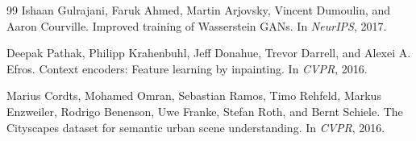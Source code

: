 \documentclass{article}
\begin{document}
\begin{thebibliography}{99}
Ishaan Gulrajani, Faruk Ahmed, Martin Arjovsky, Vincent Dumoulin, and
Aaron Courville.
\newblock Improved training of Wasserstein GANs.
\newblock In \emph{NeurIPS}, 2017.

Deepak Pathak, Philipp Krahenbuhl, Jeff Donahue, Trevor Darrell, and Alexei A.
Efros.
\newblock Context encoders: Feature learning by inpainting.
\newblock In \emph{CVPR}, 2016.

Marius Cordts, Mohamed Omran, Sebastian Ramos, Timo Rehfeld, Markus Enzweiler,
Rodrigo Benenson, Uwe Franke, Stefan Roth, and Bernt Schiele.
\newblock The Cityscapes dataset for semantic urban scene understanding.
\newblock In \emph{CVPR}, 2016.

\end{thebibliography}
\end{document}
